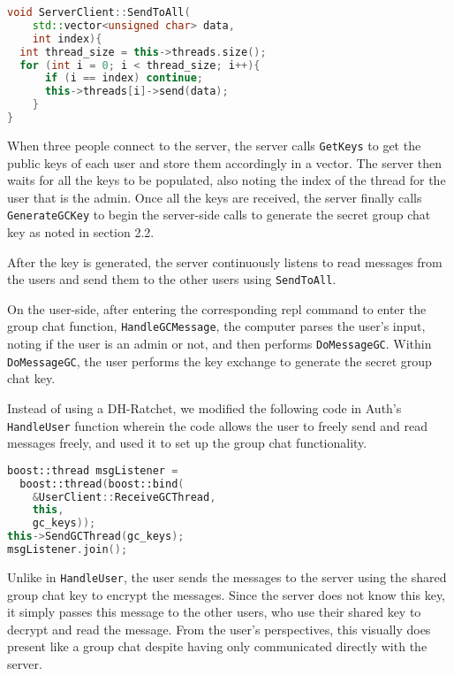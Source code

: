 \documentclass[sigconf]{acmart}
\begin{document}
\begin{framed}
\begin{lstlisting}[language=C++]
void ServerClient::SendToAll(
    std::vector<unsigned char> data, 
    int index){
  int thread_size = this->threads.size();
  for (int i = 0; i < thread_size; i++){
      if (i == index) continue;
      this->threads[i]->send(data);
    }
}

\end{lstlisting}
\end{framed}

When three people connect to the server, the server calls \texttt{GetKeys} to get the public keys of each user and store them accordingly in a vector. The server then waits for all the keys to be populated, also noting the index of the thread for the user that is the admin. Once all the keys are received, the server finally calls \texttt{GenerateGCKey} to begin the server-side calls to generate the secret group chat key as noted in section 2.2.

After the key is generated, the server continuously listens to read messages from the users and send them to the other users using \texttt{SendToAll}.

On the user-side, after entering the corresponding repl command to enter the group chat function, \texttt{HandleGCMessage}, the computer parses the user's input, noting if the user is an admin or not, and then performs \texttt{DoMessageGC}. Within \texttt{DoMessageGC}, the user performs the key exchange to generate the secret group chat key. 

Instead of using a DH-Ratchet, we modified the following code in Auth's \texttt{HandleUser} function wherein the code allows the user to freely send and read messages freely, and used it to set up the group chat functionality. 
\begin{framed}
\begin{lstlisting}[language=C++]
boost::thread msgListener =
  boost::thread(boost::bind(
    &UserClient::ReceiveGCThread, 
    this, 
    gc_keys));
this->SendGCThread(gc_keys);
msgListener.join();
\end{lstlisting}
\end{framed}
Unlike in \texttt{HandleUser}, the user sends the messages to the server using the shared group chat key to encrypt the messages. Since the server does not know this key, it simply passes this message to the other users, who use their shared key to decrypt and read the message. From the user's perspectives, this visually does present like a group chat despite having only communicated directly with the server.
\end{document}
